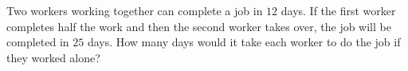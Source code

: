 
%
%
%
%
% 
% 

\question[4] Two workers working together can complete a job in $12$ days. If the first worker completes half the work and then the second worker takes over, the job will be completed in $25$ days. How many days would it take each worker to do the job if they worked alone?


\ifprintanswers
\fi 


